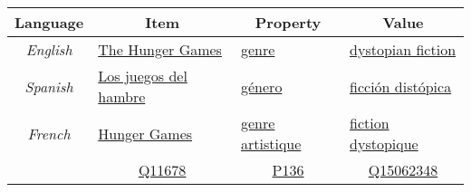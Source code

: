 \documentclass{standalone}
\begin{document}
\begin{tabular}{|c|l|l|l|}
    \hline
    \rowcolor[HTML]{EFEFEF}
    \textbf{Language}     & \multicolumn{1}{c|}{\cellcolor[HTML]{EFEFEF}\textbf{Item}}                              & \multicolumn{1}{c|}{\cellcolor[HTML]{EFEFEF}\textbf{Property}}                            & \multicolumn{1}{c|}{\cellcolor[HTML]{EFEFEF}\textbf{Value}}                             \\ \hline
    \textit{English}      & \multicolumn{1}{l|}{\href{https://www.wikidata.org/wiki/Q11678}{The Hunger Games}}      & \multicolumn{1}{l|}{\href{https://www.wikidata.org/wiki/Property:P136}{genre}}            & \multicolumn{1}{l|}{\href{https://www.wikidata.org/wiki/Q15062348}{dystopian fiction}}  \\ \hline
    \textit{Spanish}      & \multicolumn{1}{l|}{\href{https://www.wikidata.org/wiki/Q11678}{Los juegos del hambre}} & \multicolumn{1}{l|}{\href{https://www.wikidata.org/wiki/Property:P136}{género}}           & \multicolumn{1}{l|}{\href{https://www.wikidata.org/wiki/Q15062348}{ficción distópica}}  \\ \hline
    \textit{French}       & \multicolumn{1}{l|}{ \href{https://www.wikidata.org/wiki/Q11678}{Hunger Games}}         & \multicolumn{1}{l|}{\href{https://www.wikidata.org/wiki/Property:P136}{genre artistique}} & \multicolumn{1}{l|}{\href{https://www.wikidata.org/wiki/Q15062348}{fiction dystopique}} \\ \hline
    \multicolumn{1}{l|}{} & \multicolumn{1}{c|}{\href{https://www.wikidata.org/wiki/Q11678}{Q11678}}                & \multicolumn{1}{c|}{\href{https://www.wikidata.org/wiki/Property:P136}{P136}}             & \multicolumn{1}{c|}{\href{https://www.wikidata.org/wiki/Q15062348}{Q15062348}}          \\ \cline{2-4}
\end{tabular}
\end{document}
